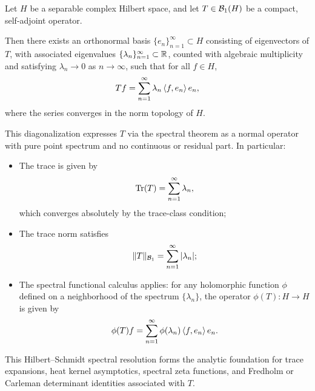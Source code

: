 \begin{definition}
\label{def:spectral_decomposition_compact}
Let \( H \) be a separable complex Hilbert space, and let \( T \in \mathcal{B}_1(H) \) be a compact, self-adjoint operator.

Then there exists an orthonormal basis \( \{ e_n \}_{n=1}^\infty \subset H \) consisting of eigenvectors of \( T \), with associated eigenvalues \( \{ \lambda_n \}_{n=1}^\infty \subset \mathbb{R} \), counted with algebraic multiplicity and satisfying \( \lambda_n \to 0 \) as \( n \to \infty \), such that for all \( f \in H \),
\[
T f = \sum_{n=1}^\infty \lambda_n \left\langle f, e_n \right\rangle e_n,
\]
where the series converges in the norm topology of \( H \).

\medskip
\noindent
This diagonalization expresses \( T \) via the spectral theorem as a normal operator with pure point spectrum and no continuous or residual part. In particular:
\begin{itemize}
  \item The trace is given by
  \[
  \operatorname{Tr}(T) = \sum_{n=1}^\infty \lambda_n,
  \]
  which converges absolutely by the trace-class condition;

  \item The trace norm satisfies
  \[
  \|T\|_{\mathcal{B}_1} = \sum_{n=1}^\infty |\lambda_n|;
  \]

  \item The spectral functional calculus applies: for any holomorphic function \( \phi \) defined on a neighborhood of the spectrum \( \{ \lambda_n \} \), the operator \( \phi(T) \colon H \to H \) is given by
  \[
  \phi(T) f = \sum_{n=1}^\infty \phi(\lambda_n) \left\langle f, e_n \right\rangle e_n.
  \]
\end{itemize}

\medskip
\noindent
This Hilbert–Schmidt spectral resolution forms the analytic foundation for trace expansions, heat kernel asymptotics, spectral zeta functions, and Fredholm or Carleman determinant identities associated with \( T \).
\end{definition}

